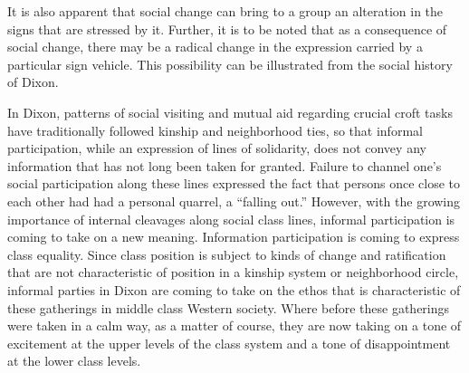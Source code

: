\documentclass[twoside,symmetric,nobib,justified]{tufte-book}
\begin{document}
It is also apparent that social change can bring to a group an
alteration in the signs that are stressed by it. Further, it is to be
noted that as a consequence of social change, there may be a radical
change in the expression carried by a particular sign vehicle. This
possibility can be illustrated from the social history of Dixon.

In Dixon, patterns of social visiting and mutual aid regarding crucial
croft tasks have traditionally followed kinship and neighborhood ties,
so that informal participation, while an expression of lines of
solidarity, does not convey any information that has not long been taken
for granted. Failure to channel one's social participation along these
lines expressed the fact that persons once close to each other had had a
personal quarrel, a ``falling out.'' However, with the growing
importance of internal cleavages along social class lines, informal
participation is coming to take on a new meaning. Information
participation is coming to express class equality. Since class position
is subject to kinds of change and ratification that are not
characteristic of position in a kinship system or neighborhood circle,
informal parties in Dixon are coming to take on the ethos that is
characteristic of these gatherings in middle class Western society.
Where before these gatherings were taken in a calm way, as a matter of
course, they are now taking on a tone of excitement at the upper levels
of the class system and a tone of disappointment at the lower class
levels.
\end{document}
